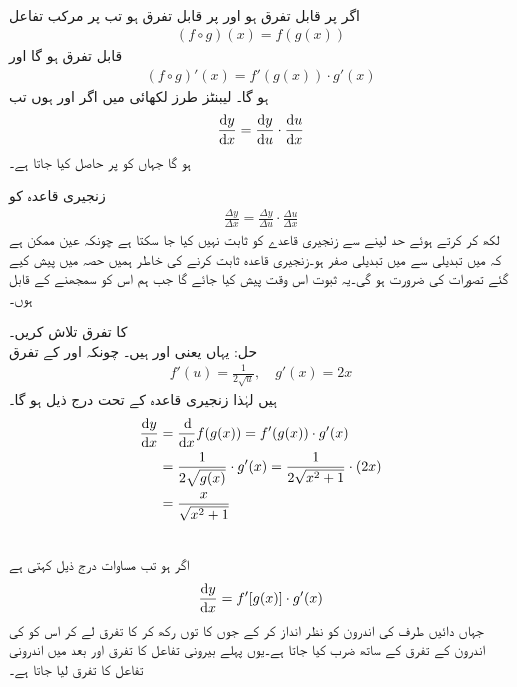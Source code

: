 \\
اگر  پر  قابل تفرق ہو اور  پر  قابل تفرق ہو تب  پر مرکب تفاعل
\begin{align*}
 (f\circ g)(x)=f(g(x))
\end{align*}
قابل تفرق ہو گا اور
\begin{align}\label{مساوات_تفرق_زنجیری_الف}
(f\circ g)'(x)=f'(g(x))\cdot g'(x)
\end{align}
ہو گا۔ لیبنٹز طرز لکھائی میں اگر  اور  ہوں تب 
\begin{align}\label{مساوات_تفرق_زنجیری_ب}
\frac{\dif y}{\dif x}=\frac{\dif y}{\dif u}\cdot \frac{\dif u}{\dif x}
\end{align}
ہو گا جہاں  کو  پر حاصل کیا جاتا ہے۔

زنجیری قاعدہ کو
\begin{align*}
\frac{\Delta y}{\Delta x}=\frac{\Delta y}{\Delta u}\cdot \frac{\Delta u}{\Delta x}
\end{align*}
لکھ کر  کرتے ہوئے حد لینے سے زنجیری قاعدے کو ثابت نہیں کیا جا سکتا ہے چونکہ عین ممکن ہے کہ  میں تبدیلی سے  میں تبدیلی  صفر ہو۔زنجیری قاعدہ ثابت کرنے کی خاطر ہمیں حصہ  میں پیش کیے گئے تصورات کی ضرورت ہو گی۔یہ ثبوت اس وقت پیش کیا جائے گا جب ہم اس کو سمجھنے کے قابل ہوں۔

 کا تفرق تلاش کریں۔\\
حل:\quad
یہاں  یعنی  اور  ہیں۔ چونکہ  اور  کے تفرق
\begin{align*}
f'(u)=\frac{1}{2\sqrt{u}},\quad g'(x)=2x
\end{align*}
ہیں لہٰذا زنجیری قاعدہ کے تحت درج ذیل ہو گا۔
\begin{align*}
\frac{\dif y}{\dif x}&=\frac{\dif}{\dif x}f(g(x))=f'(g(x))\cdot g'(x)\\
&=\frac{1}{2\sqrt{g(x)}}\cdot g'(x)=\frac{1}{2\sqrt{x^2+1}}\cdot (2x)\\
&=\frac{x}{\sqrt{x^2+1}}
\end{align*}

\\
اگر  ہو تب مساوات  درج ذیل کہتی ہے
\begin{align}
\frac{\dif y}{\dif x}=f'[g(x)]\cdot g'(x)
\end{align}
جہاں دائیں طرف  کی اندرون کو نظر انداز کر کے جوں کا توں رکھ کر   کا تفرق لے کر اس کو  کی اندرون کے تفرق کے ساتھ ضرب کیا جاتا ہے۔یوں پہلے بیرونی تفاعل کا تفرق اور بعد میں اندرونی تفاعل کا تفرق لیا جاتا ہے۔

